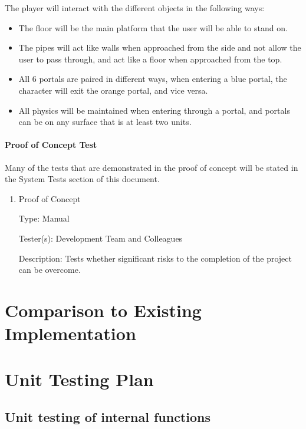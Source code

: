 \documentclass[12pt, titlepage]{article}
\begin{document}
The player will interact with the different objects in the following ways:
\begin{itemize}  
\item The floor will be the main platform that the user will be able to stand on.
\item The pipes will act like walls when approached from the side and not allow the user to pass through, and act like a floor when approached from the top.
\item All 6 portals are paired in different ways, when entering a blue portal, the character will exit the orange portal, and vice versa.
\item All physics will be maintained when entering through a portal, and portals can be on any surface that is at least two units.
\end{itemize}


\paragraph{Proof of Concept Test}

Many of the tests that are demonstrated in the proof of concept will be stated in the System Tests section of this document.

\begin{enumerate}

\item{Proof of Concept}

Type: Manual

Tester(s): Development Team and Colleagues

Description: Tests whether significant risks to the completion of the project can be overcome.

\end{enumerate}
	
\section{Comparison to Existing Implementation}	
				
\section{Unit Testing Plan}
		
\subsection{Unit testing of internal functions}
		
\end{document}
